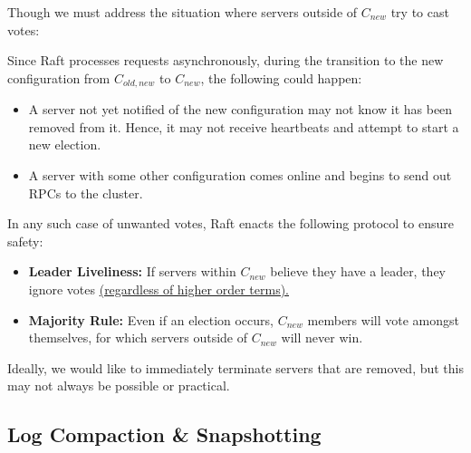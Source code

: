 \newpage

\noindent
Though we must address the situation where servers outside of $C_{new}$ try to 
cast votes:
\begin{Def}

    Since Raft processes requests asynchronously, during the transition to the new configuration 
    from $C_{old,new}$ to $C_{new}$, the following could happen:
    \begin{itemize}
        \item A server not yet notified of the new configuration may not know it has been removed from it.
        Hence, it may not receive heartbeats and attempt to start a new election.
        \item A server with some other configuration comes online and begins to send out RPCs to the cluster.
    \end{itemize}

    \noindent
    In any such case of unwanted votes, Raft enacts the following protocol to ensure safety:
    \begin{itemize}
        \item \textbf{Leader Liveliness:} If servers within $C_{new}$ believe they have a leader, they ignore votes \underline{(regardless of higher order terms).}
        \item \textbf{Majority Rule:} Even if an election occurs, $C_{new}$ members will vote amongst themselves, for which servers outside of $C_{new}$ will never win.
    \end{itemize}

    \noindent
    Ideally, we would like to immediately terminate servers that are removed, but this may not always be possible or practical.
\end{Def}

\vspace{-1em}
\noindent
\subsection{Log Compaction \& Snapshotting}

